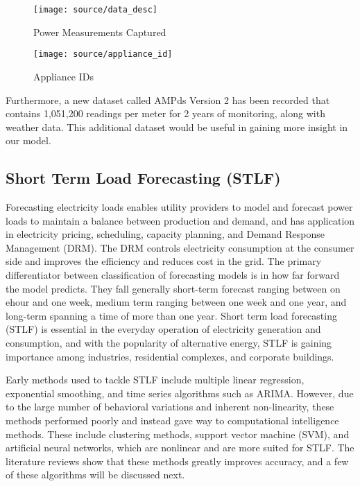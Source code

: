 \documentclass[12pt,twocolumn]{article}
\begin{document}
				\begin{figure}[!htbp]
					\centering
					\texttt{[image: source/data\_desc]}
					\caption{Power Measurements Captured}
					\label{fig:varnorm}
				\end{figure}

				\begin{figure}[!h]
					\centering
					\texttt{[image: source/appliance\_id]}
					\caption{Appliance IDs}
					\label{fig:varnorm}
				\end{figure}

				\quad Furthermore, a new dataset called AMPds Version 2 has been recorded that contains 1,051,200 readings per meter for 2 years of monitoring, along with weather data. This additional dataset would be useful in gaining more insight in our model. 

		\subsection{Short Term Load Forecasting (STLF)}

			\quad Forecasting electricity loads enables utility providers to model and forecast power loads to maintain a balance between production and demand, and has application in electricity pricing, scheduling, capacity planning, and Demand Response Management (DRM). The DRM controls electricity consumption at the consumer side and improves the efficiency and reduces cost in the grid. The primary differentiator between classification of forecasting models is in how far forward the model predicts. They fall generally short-term forecast ranging between on ehour and one week, medium term ranging between one week and one year, and long-term spanning a time of more than one year. Short term load forecasting (STLF) is essential in the everyday operation of electricity generation and consumption, and with the popularity of alternative energy, STLF is gaining importance among industries, residential complexes, and corporate buildings. \newline

			\quad Early methods used to tackle STLF include multiple linear regression, exponential smoothing, and time series algorithms such as ARIMA. However, due to the large number of behavioral variations and inherent non-linearity, these methods performed poorly and instead gave way to computational intelligence methods. These include clustering methods, support vector machine (SVM), and artificial neural networks, which are nonlinear and are more suited for STLF. The literature reviews show that these methods greatly improves accuracy, and a few of these algorithms will be discussed next.
\end{document}
